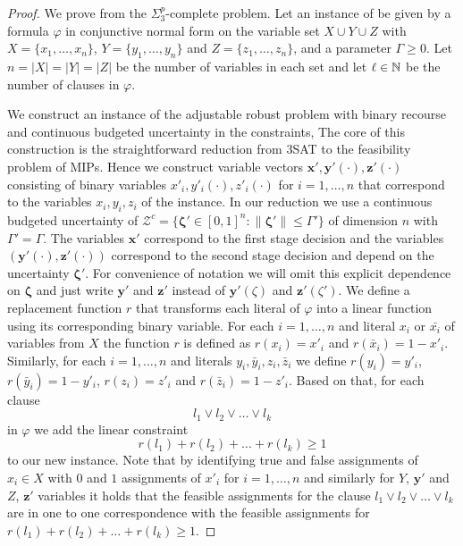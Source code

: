 \begin{proof}
    We prove  from the $\Sigma_3^p$-complete
    {\radj} problem. 
    Let an instance of {\radj} be given by a formula $\varphi$ in conjunctive normal form 
    on the variable set $X \cup Y \cup Z$ with $X=\{x_1, \dots, x_n\}$, $Y=\{y_1,\dots,y_n\}$ and $Z=\{z_1,\dots,z_n\}$,
    and a parameter $\Gamma \geq 0$. 
    Let $n = |X| = |Y| = |Z|$ be the number of variables in each set and let $\ell \in \mathbb{N}$ be the number of clauses in $\varphi$. 
    
    We construct an instance of the adjustable robust problem with binary recourse and continuous budgeted uncertainty
    in the constraints, 
    The core of this construction is the straightforward reduction from 3SAT to the feasibility problem of MIPs.
    Hence we construct variable vectors $\pmb{x}', \pmb{y}'(\cdot), \pmb{z}'(\cdot)$ consisting of binary variables $x'_i, y'_i(\cdot), z'_i(\cdot)$ for 
    $i=1,\dots,n$ that correspond to the variables $x_i,y_i,z_i$ of the {\radj} instance.
    In our reduction we use a continuous budgeted uncertainty of $\mathcal{Z}^c = \{\pmb{\zeta}' \in [0,1]^n \colon \| \pmb{\zeta}' \| \leq \Gamma'\}$ of dimension $n$ with $\Gamma' = \Gamma$.
    The variables $\pmb{x}'$ correspond to the first stage decision and the variables $(\pmb{y}'(\cdot), \pmb{z}'(\cdot))$
    correspond to the second stage decision and depend on the uncertainty $\pmb{\zeta}'$.
    For convenience of notation we will omit this explicit dependence on $\pmb{\zeta}$ and just write $\pmb{y}'$ and $\pmb{z}'$ instead of $\pmb{y}'(\zeta)$ and $\pmb{z}'(\zeta')$.
    We define a replacement function $r$ that transforms each literal of $\varphi$ into a linear function using its corresponding binary variable.
    For each $i=1,\dots,n$ and literal $x_i$ or $\bar{x_i}$ of variables from $X$ the function $r$ is defined as 
    $r(x_i) = x'_i$ and $r(\bar{x}_i) = 1-x'_i$.
    Similarly, for each $i=1,\dots,n$ and literals $y_i, \bar{y}_i, z_i, \bar{z}_i$ we define 
    $r(y_i) = y'_i$, $r(\bar{y}_i) = 1-y'_i$, $r(z_i) = z'_i$ and $r(\bar{z}_i) = 1-z'_i$.
    Based on that, for each clause 
    \[ l_1 \lor l_2 \lor \dots \lor l_k \]
    in $\varphi$ we add the linear constraint
    \[ r(l_1) + r(l_2) + \dots + r(l_k) \geq 1 \] 
    to our new instance. Note that by identifying true and false assignments of $x_i \in X$ with $0$ and $1$ 
    assignments of $x'_i$ for $i=1,\dots,n$ and similarly for $Y$, $\pmb{y}'$ and $Z$, $\pmb{z}'$ variables 
    it holds that the feasible assignments for the clause $l_1 \lor l_2 \lor \dots \lor l_k$ are in one to one 
    correspondence with the feasible assignments for $r(l_1) + r(l_2) + \dots + r(l_k) \geq 1$.


\end{proof}
